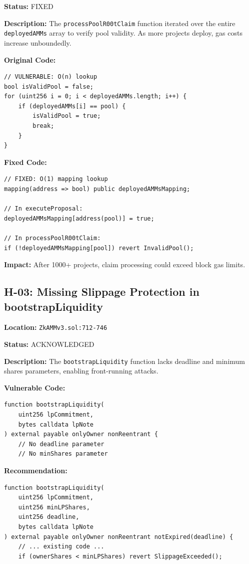 \documentclass[11pt,a4paper]{article}
\begin{document}
\textbf{Status:} \colorbox{low!30}{FIXED}

\textbf{Description:}
The \texttt{processPoolR00tClaim} function iterated over the entire \texttt{deployedAMMs} array to verify pool validity. As more projects deploy, gas costs increase unboundedly.

\textbf{Original Code:}
\begin{lstlisting}
// VULNERABLE: O(n) lookup
bool isValidPool = false;
for (uint256 i = 0; i < deployedAMMs.length; i++) {
    if (deployedAMMs[i] == pool) {
        isValidPool = true;
        break;
    }
}
\end{lstlisting}

\textbf{Fixed Code:}
\begin{lstlisting}
// FIXED: O(1) mapping lookup
mapping(address => bool) public deployedAMMsMapping;

// In executeProposal:
deployedAMMsMapping[address(pool)] = true;

// In processPoolR00tClaim:
if (!deployedAMMsMapping[pool]) revert InvalidPool();
\end{lstlisting}

\textbf{Impact:} After 1000+ projects, claim processing could exceed block gas limits.

\vspace{1em}

\begin{highbox}
\subsection{H-03: Missing Slippage Protection in bootstrapLiquidity}
\end{highbox}

\textbf{Location:} \texttt{ZkAMMv3.sol:712-746}

\textbf{Status:} \colorbox{medium!30}{ACKNOWLEDGED}

\textbf{Description:}
The \texttt{bootstrapLiquidity} function lacks deadline and minimum shares parameters, enabling front-running attacks.

\textbf{Vulnerable Code:}
\begin{lstlisting}
function bootstrapLiquidity(
    uint256 lpCommitment,
    bytes calldata lpNote
) external payable onlyOwner nonReentrant {
    // No deadline parameter
    // No minShares parameter
\end{lstlisting}

\textbf{Recommendation:}
\begin{lstlisting}
function bootstrapLiquidity(
    uint256 lpCommitment,
    uint256 minLPShares,
    uint256 deadline,
    bytes calldata lpNote
) external payable onlyOwner nonReentrant notExpired(deadline) {
    // ... existing code ...
    if (ownerShares < minLPShares) revert SlippageExceeded();
\end{lstlisting}
\end{document}
